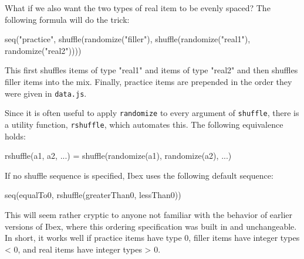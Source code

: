 \documentclass[
]{article}
\newenvironment{Shaded}{}{}
\newcommand{\FunctionTok}[1]{\textcolor[rgb]{0.02,0.16,0.49}{#1}}
\newcommand{\NormalTok}[1]{#1}
\newcommand{\OperatorTok}[1]{\textcolor[rgb]{0.40,0.40,0.40}{#1}}
\newcommand{\StringTok}[1]{\textcolor[rgb]{0.25,0.44,0.63}{#1}}
\begin{document}
What if we also want the two types of real item to be evenly spaced? The
following formula will do the trick:

\begin{Shaded}
\begin{Highlighting}[]
    \FunctionTok{seq}\NormalTok{(}\StringTok{"practice"}\OperatorTok{,} \FunctionTok{shuffle}\NormalTok{(}\FunctionTok{randomize}\NormalTok{(}\StringTok{"filler"}\NormalTok{)}\OperatorTok{,}
                            \FunctionTok{shuffle}\NormalTok{(}\FunctionTok{randomize}\NormalTok{(}\StringTok{"real1"}\NormalTok{)}\OperatorTok{,}
                                    \FunctionTok{randomize}\NormalTok{(}\StringTok{"real2"}\NormalTok{))))}
\end{Highlighting}
\end{Shaded}

This first shuffles items of type "real1" and items of type "real2" and
then shuffles filler items into the mix. Finally, practice items are
prepended in the order they were given in \texttt{data.js}.

Since it is often useful to apply \texttt{randomize} to every argument
of \texttt{shuffle}, there is a utility function, \texttt{rshuffle},
which automates this. The following equivalence holds:

\begin{Shaded}
\begin{Highlighting}[]
    \FunctionTok{rshuffle}\NormalTok{(a1}\OperatorTok{,}\NormalTok{ a2}\OperatorTok{,} \OperatorTok{...}\NormalTok{) }\OperatorTok{=} \FunctionTok{shuffle}\NormalTok{(}\FunctionTok{randomize}\NormalTok{(a1)}\OperatorTok{,} \FunctionTok{randomize}\NormalTok{(a2)}\OperatorTok{,} \OperatorTok{...}\NormalTok{)}
\end{Highlighting}
\end{Shaded}

If no shuffle sequence is specified, Ibex uses the following default
sequence:

\begin{Shaded}
\begin{Highlighting}[]
    \FunctionTok{seq}\NormalTok{(equalTo0}\OperatorTok{,} \FunctionTok{rshuffle}\NormalTok{(greaterThan0}\OperatorTok{,}\NormalTok{ lessThan0))}
\end{Highlighting}
\end{Shaded}

This will seem rather cryptic to anyone not familiar with the behavior
of earlier versions of Ibex, where this ordering specification was built
in and unchangeable. In short, it works well if practice items have type
0, filler items have integer types \textless{} 0, and real items have
integer types \textgreater{} 0.
\end{document}
